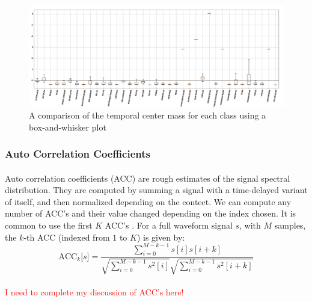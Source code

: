 \documentclass[12pt,letterpaper]{article}
\begin{document}
\begin{figure}[H]
\begin{center}
\includegraphics[scale=0.3]{../FiguresFeatures/TCM}
\end{center}
\caption{A comparison of the temporal center mass for each class using a box-and-whisker plot}
\label{fig-FeatureTCM}
\end{figure}


\subsubsection{Auto Correlation Coefficients}

\paragraph*{}Auto correlation coefficients (ACC) are rough estimates of the signal spectral distribution. They are computed by summing a signal with a time-delayed variant of itself, and then normalized depending on the contect. We can compute any number of ACC's and their value changed depending on the index chosen. It is common to use the first $K$ ACC's \cite{Serizel}. For a full waveform signal $s$, with $M$ samples, the $k$-th ACC (indexed from $1$ to $K$) is given by:
\begin{equation}
\label{eqn-FeatureACC}
\text{ACC}_k\big[ s \big] = 
\frac{\sum_{i=0}^{M-k-1}s[i]s[i+k]} {\sqrt{\sum_{i=0}^{M-k-1}s^2[i]} 
\sqrt{\sum_{i=0}^{M-k-1}s^2[i+k]}}
\end{equation}

\paragraph*{}\textcolor{red}{I need to complete my discussion of ACC's here!}
\end{document}
